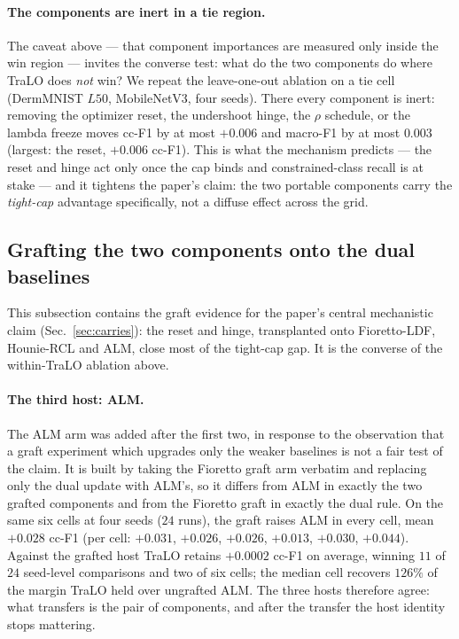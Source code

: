 \documentclass[10pt]{article}
\begin{document}
{\color{blue}
\paragraph{The components are inert in a tie region.}
The caveat above --- that component importances are measured only inside the win
region --- invites the converse test: what do the two components do where TraLO does
\emph{not} win? We repeat the leave-one-out ablation on a tie cell (DermMNIST $L50$,
MobileNetV3, four seeds). There every component is inert: removing the optimizer
reset, the undershoot hinge, the $\rho$ schedule, or the lambda freeze moves cc-F1 by
at most $+0.006$ and macro-F1 by at most $0.003$ (largest: the reset, $+0.006$ cc-F1).
This is what the mechanism predicts --- the reset and hinge act only once the cap binds
and constrained-class recall is at stake --- and it tightens the paper's claim: the two
portable components carry the \emph{tight-cap} advantage specifically, not a diffuse
effect across the grid.}



\subsection{Grafting the two components onto the dual baselines}
\label{app:graft}

This subsection contains the graft evidence for the paper's central
mechanistic claim (Sec.~\ref{sec:carries}): the reset and hinge,
transplanted onto Fioretto-LDF{\color{blue},} Hounie-RCL{\color{blue} and ALM},
close most of the
tight-cap gap. It is the converse of the within-TraLO ablation above.

{\color{blue}
\paragraph{The third host: ALM.}
The ALM arm was added after the first two, in response to the observation that a
graft experiment which upgrades only the weaker baselines is not a fair test of
the claim. It is built by taking the Fioretto graft arm verbatim and replacing
only the dual update with ALM's, so it differs from ALM in exactly the two
grafted components and from the Fioretto graft in exactly the dual rule. On the
same six cells at four seeds ($24$ runs), the graft raises ALM in every cell,
mean $+0.028$ cc-F1 (per cell: $+0.031$, $+0.026$, $+0.026$, $+0.013$, $+0.030$,
$+0.044$). Against the grafted host TraLO retains $+0.0002$ cc-F1 on average,
winning $11$ of $24$ seed-level comparisons and two of six cells; the median cell
recovers $126\%$ of the margin TraLO held over ungrafted ALM. The three hosts
therefore agree: what transfers is the pair of components, and after the transfer
the host identity stops mattering.}
\end{document}
